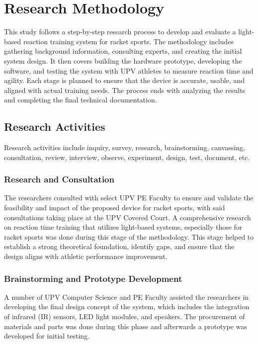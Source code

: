 \chapter{Research Methodology}

	This study follows a step-by-step research process to develop and evaluate a light-based reaction training system for racket sports. The methodology includes gathering background information, consulting experts, and creating the initial system design. It then covers building the hardware prototype, developing the software, and testing the system with UPV athletes to measure reaction time and agility. Each stage is planned to ensure that the device is accurate, usable, and aligned with actual training needs. The process ends with analyzing the results and completing the final technical documentation.

\section{Research Activities}

	Research activities include inquiry, survey, research, brainstorming, canvassing, consultation, review, interview, observe, experiment, design, test, document, etc.

\subsection{Research and Consultation}

	The researchers consulted with select UPV PE Faculty to ensure and validate the feasibility and impact of the proposed device for racket sports, with said consultations taking place at the UPV Covered Court. A comprehensive research on reaction time training that utilizes light-based systems, especially those for racket sports was done during this stage of the methodology. This stage helped to establish a strong theoretical foundation, identify gaps, and ensure that the design aligns with athletic performance improvement.

\subsection{Brainstorming and Prototype Development}

	A number of UPV Computer Science and PE Faculty assisted the researchers in developing the final design concept of the system, which includes the integration of infrared (IR) sensors, LED light modules, and speakers. The procurement of materials and parts was done during this phase and afterwards a prototype was developed for initial testing.
	
